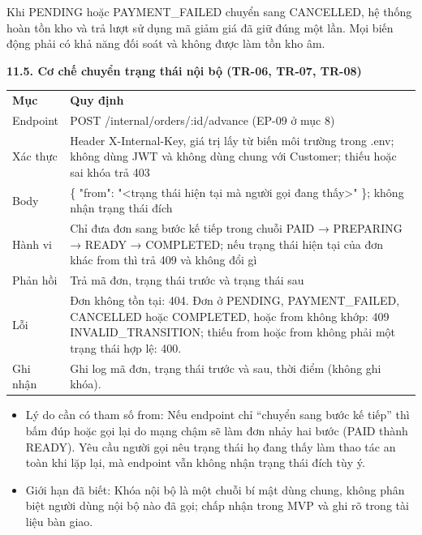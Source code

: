\documentclass[11pt,a4paper,oneside]{report}
\begin{document}
Khi PENDING hoặc PAYMENT\_FAILED chuyển sang CANCELLED, hệ thống hoàn tồn kho và trả lượt sử dụng mã giảm giá đã giữ đúng một lần. Mọi biến động phải có khả năng đối soát và không được làm tồn kho âm.

\textbf{11.5. Cơ chế chuyển trạng thái nội bộ (TR-06, TR-07, TR-08)}

\begin{longtable}[]{@{}
  >{\raggedright\arraybackslash}p{}
  >{\raggedright\arraybackslash}p{}@{}}
\toprule\noalign{}
\endhead
\bottomrule\noalign{}
\endlastfoot
\textbf{Mục} & \textbf{Quy định} \\
Endpoint & POST /internal/orders/:id/advance (EP-09 ở mục 8) \\
Xác thực & Header X-Internal-Key, giá trị lấy từ biến môi trường trong .env; không dùng JWT và không dùng chung với Customer; thiếu hoặc sai khóa trả 403 \\
Body & \{ "from": "\textless trạng thái hiện tại mà người gọi đang thấy\textgreater" \}; không nhận trạng thái đích \\
Hành vi & Chỉ đưa đơn sang bước kế tiếp trong chuỗi PAID → PREPARING → READY → COMPLETED; nếu trạng thái hiện tại của đơn khác from thì trả 409 và không đổi gì \\
Phản hồi & Trả mã đơn, trạng thái trước và trạng thái sau \\
Lỗi & Đơn không tồn tại: 404. Đơn ở PENDING, PAYMENT\_FAILED, CANCELLED hoặc COMPLETED, hoặc from không khớp: 409 INVALID\_TRANSITION; thiếu from hoặc from không phải một trạng thái hợp lệ: 400. \\
Ghi nhận & Ghi log mã đơn, trạng thái trước và sau, thời điểm (không ghi khóa). \\
\end{longtable}

\begin{itemize}
\item
  Lý do cần có tham số from: Nếu endpoint chỉ ``chuyển sang bước kế tiếp'' thì bấm đúp hoặc gọi lại do mạng chậm sẽ làm đơn nhảy hai bước (PAID thành READY). Yêu cầu người gọi nêu trạng thái họ đang thấy làm thao tác an toàn khi lặp lại, mà endpoint vẫn không nhận trạng thái đích tùy ý.
\item
  Giới hạn đã biết: Khóa nội bộ là một chuỗi bí mật dùng chung, không phân biệt người dùng nội bộ nào đã gọi; chấp nhận trong MVP và ghi rõ trong tài liệu bàn giao.
\end{itemize}
\end{document}
